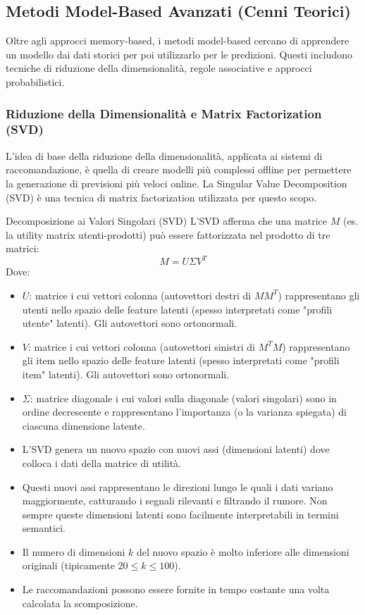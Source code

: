 \documentclass{article}
\begin{document}
\subsection{Metodi Model-Based Avanzati (Cenni Teorici)}
Oltre agli approcci memory-based, i metodi model-based cercano di apprendere un modello dai dati storici per poi utilizzarlo per le predizioni. Questi includono tecniche di riduzione della dimensionalità, regole associative e approcci probabilistici.

\subsubsection{Riduzione della Dimensionalità e Matrix Factorization (SVD)}
L'idea di base della riduzione della dimensionalità, applicata ai sistemi di raccomandazione, è quella di creare modelli più complessi offline per permettere la generazione di previsioni più veloci online. La Singular Value Decomposition (SVD) è una tecnica di matrix factorization utilizzata per questo scopo.

\begin{definitionbox}{Decomposizione ai Valori Singolari (SVD)}
    L'SVD afferma che una matrice $M$ (es. la utility matrix utenti-prodotti) può essere fattorizzata nel prodotto di tre matrici:
    $$ M = U \Sigma V^T $$
    Dove:
    \begin{itemize}
        \item $U$: matrice i cui vettori colonna (autovettori destri di $MM^T$) rappresentano gli utenti nello spazio delle feature latenti (spesso interpretati come "profili utente" latenti). Gli autovettori sono ortonormali.
        \item $V$: matrice i cui vettori colonna (autovettori sinistri di $M^T M$) rappresentano gli item nello spazio delle feature latenti (spesso interpretati come "profili item" latenti). Gli autovettori sono ortonormali.
        \item $\Sigma$: matrice diagonale i cui valori sulla diagonale (valori singolari) sono in ordine decrescente e rappresentano l'importanza (o la varianza spiegata) di ciascuna dimensione latente.
    \end{itemize}
\end{definitionbox}

\begin{itemize}
    \item L'SVD genera un nuovo spazio con nuovi assi (dimensioni latenti) dove colloca i dati della matrice di utilità.
    \item Questi nuovi assi rappresentano le direzioni lungo le quali i dati variano maggiormente, catturando i segnali rilevanti e filtrando il rumore. Non sempre queste dimensioni latenti sono facilmente interpretabili in termini semantici.
    \item Il numero di dimensioni $k$ del nuovo spazio è molto inferiore alle dimensioni originali (tipicamente $20 \le k \le 100$).
    \item Le raccomandazioni possono essere fornite in tempo costante una volta calcolata la scomposizione.
\end{itemize}
\end{document}
